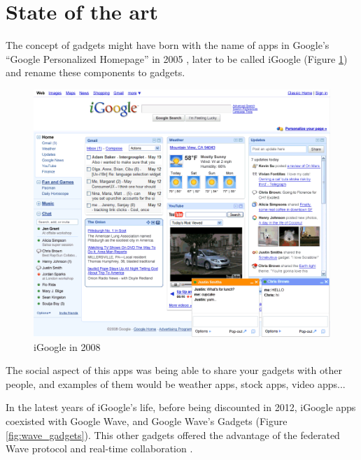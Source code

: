 
\newpage
\section{State of the art}

The concept of gadgets might have born with the name of apps in Google's ``Google Personalized Homepage'' in 2005 \cite{ref:what_happened_to_igoogle}, later to be called iGoogle (Figure \ref{fig:igoogle_2008}) and rename these components to gadgets.

\begin{figure}[h]
  \center
    \includegraphics[keepaspectratio, scale=0.6]{Media/Captures/Soa/iGoogle.png}
  \caption{iGoogle in 2008}
  \label{fig:igoogle_2008}
\end{figure}

The social aspect of this apps was being able to share your gadgets with other people, and examples of them would be weather apps, stock apps, video apps...


In the latest years of iGoogle's life, before being discounted in 2012, iGoogle apps coexisted with Google Wave, and Google Wave's Gadgets (Figure \ref{fig:wave_gadgets}). This other gadgets offered the advantage of the federated Wave protocol and real-time collaboration \cite{ref:apache_wave_about}.

